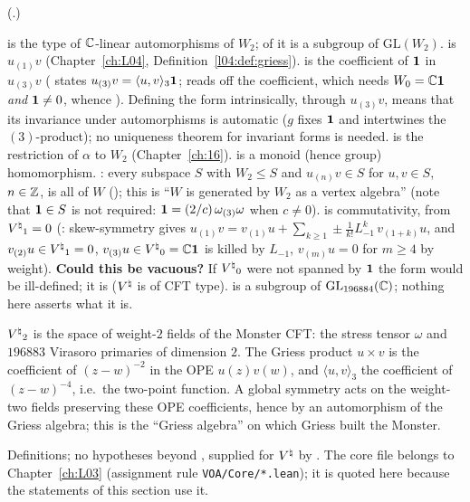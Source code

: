 (.)
\begin{dictionary}
 is the type of ${\mathbb{C}}$-linear automorphisms of $W_2$;  of it is a
subgroup of $\mathrm{GL}(W_2)$.   is $u_{(1)}v$ (Chapter~\ref{ch:L04},
Definition~\ref{l04:def:griess}).   is the coefficient of $\mathbf 1$ in $u_{(3)}v$
( states $u_{(3)}v=\langle u,v\rangle_3\mathbf 1$;  reads off the
coefficient, which needs $W_0={\mathbb{C}}\mathbf 1$ \emph{and} $\mathbf 1\neq0$, whence ).  Defining the form
intrinsically, through $u_{(3)}v$, means that its invariance under automorphisms is automatic
($g$ fixes $\mathbf 1$ and intertwines the $(3)$-product); no uniqueness theorem for invariant forms is needed.
 is the restriction of $\alpha$ to $W_2$ (Chapter~\ref{ch:16}).   is a monoid (hence
group) homomorphism.  : every subspace $S$ with $W_2\le S$ and $u_{(n)}v\in S$ for
$u,v\in S$, $n\in{\mathbb{Z}}$, is all of $W$ (); this is ``$W$ is generated by $W_2$ as a vertex algebra'' (note that
$\mathbf 1\in S$ is not required: $\mathbf 1=(2/c)\,\omega_{(3)}\omega$ when $c\ne0$).
 is commutativity, from ${V^{\natural}}_1=0$ (: skew-symmetry
gives $u_{(1)}v=v_{(1)}u+\sum_{k\ge1}\pm\tfrac1{k!}L_{-1}^k\,v_{(1+k)}u$, and $v_{(2)}u\in{V^{\natural}}_1=0$, $v_{(3)}u\in{V^{\natural}}_0={\mathbb{C}}\mathbf 1$
is killed by $L_{-1}$, $v_{(m)}u=0$ for $m\ge4$ by weight).
\textbf{Could this be vacuous?}  If ${V^{\natural}}_0$ were not spanned by $\mathbf 1$ the form would be ill-defined; it is
(${V^{\natural}}$ is of CFT type).   is a subgroup of $\mathrm{GL}_{196884}({\mathbb{C}})$; nothing here asserts
what it is.
\end{dictionary}
\begin{physics}
${V^{\natural}}_2$ is the space of weight-$2$ fields of the Monster CFT: the stress tensor $\omega$ and $196883$ Virasoro
primaries of dimension $2$.  The Griess product $u\times v$ is the coefficient of $(z-w)^{-2}$ in the OPE $u(z)v(w)$,
and $\langle u,v\rangle_3$ the coefficient of $(z-w)^{-4}$, i.e.\ the two-point function.  A global symmetry acts on
the weight-two fields preserving these OPE coefficients, hence by an automorphism of the Griess algebra; this is the
``Griess algebra'' on which Griess built the Monster.
\end{physics}
\begin{status}
Definitions; no hypotheses beyond , supplied for ${V^{\natural}}$ by .  The core file
 belongs to Chapter~\ref{ch:L03} (assignment rule \texttt{VOA/Core/*.lean});
it is quoted here because the statements of this section use it.
\end{status}

